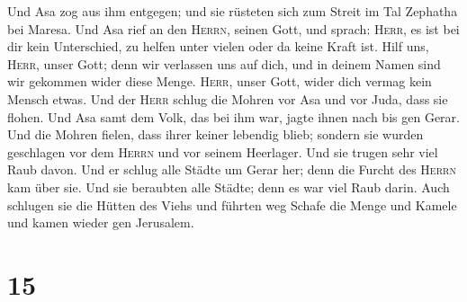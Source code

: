  Und Asa zog aus ihm entgegen; und sie rüsteten sich zum
Streit im Tal Zephatha bei Maresa.  Und Asa rief an den
\textsc{Herrn}, seinen Gott, und sprach: \textsc{Herr}, es ist bei dir
kein Unterschied, zu helfen unter vielen oder da keine Kraft ist. Hilf
uns, \textsc{Herr}, unser Gott; denn wir verlassen uns auf dich, und in
deinem Namen sind wir gekommen wider diese Menge. \textsc{Herr}, unser
Gott, wider dich vermag kein Mensch etwas.  Und der
\textsc{Herr} schlug die Mohren vor Asa und vor Juda, dass sie flohen.
 Und Asa samt dem Volk, das bei ihm war, jagte ihnen nach
bis gen Gerar. Und die Mohren fielen, dass ihrer keiner lebendig blieb;
sondern sie wurden geschlagen vor dem \textsc{Herrn} und vor seinem
Heerlager. Und sie trugen sehr viel Raub davon.  Und er
schlug alle Städte um Gerar her; denn die Furcht des \textsc{Herrn} kam
über sie. Und sie beraubten alle Städte; denn es war viel Raub darin.
 Auch schlugen sie die Hütten des Viehs und führten weg
Schafe die Menge und Kamele und kamen wieder gen Jerusalem.

\hypertarget{section-14}{%
\section{15}\label{section-14}}

